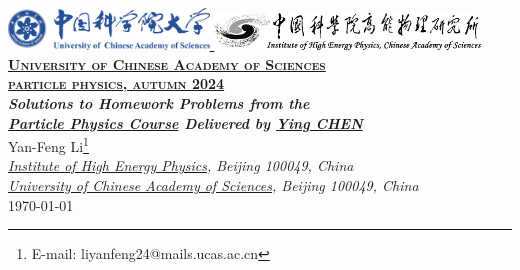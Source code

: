 \documentclass[12pt,twoside]{report}
\numberwithin{problemname}{chapter}
\begin{document}
\begin{titlepage}
    \centering
    \href{https://www.ucas.ac.cn/}{
    \includegraphics[width=0.4\textwidth]{UCAS_LOGO.png}
    }\quad\quad
    \href{https://www.ihep.cas.cn/}{
    \includegraphics[width=0.53\textwidth]{IHEP_LOGO.png}
    }\\[0.8cm]
    {\Large \href{https://www.ucas.ac.cn/}{\textbf{\textsc{University of Chinese Academy of Sciences}}}} \\[0.2cm]
    {\Large \href{https://mooc.mooc.ucas.edu.cn/mooc-ans/course/350140000013013.html?clazzId=350140000017220}{\textbf{\textsc{particle physics, autumn 2024}}}} \\[5cm]

    {\LARGE \it \textbf{Solutions to Homework Problems from the \\[0.5cm] \href{https://mooc.mooc.ucas.edu.cn/mooc-ans/course/350140000013013.html?clazzId=350140000017220}{Particle Physics Course} Delivered by \href{https://people.ucas.edu.cn/~yingchen}{Ying CHEN}}} \\[1.5cm]

    {\Large Yan-Feng Li\footnote{E-mail: liyanfeng24@mails.ucas.ac.cn}} \\[0.5cm]

    {\large \it \href{https://www.ihep.cas.cn/}{Institute of High Energy Physics}, Beijing 100049, China} \\[0.2cm]
    {\large \it \href{https://www.ucas.ac.cn/}{University of Chinese Academy of Sciences}, Beijing 100049, China} \\[1cm]

    {\large \today}
\end{titlepage}
\pagestyle{fancy}
\setlength{\headheight}{14.5pt}
\renewcommand{\headrulewidth}{0.4pt}
\newpage
{}
\tableofcontents
\newpage
{}
\setcounter{page}{1}
\fancyfoot{}
\fancyfoot[C]{-\enspace\thepage\enspace-}
\end{document}
